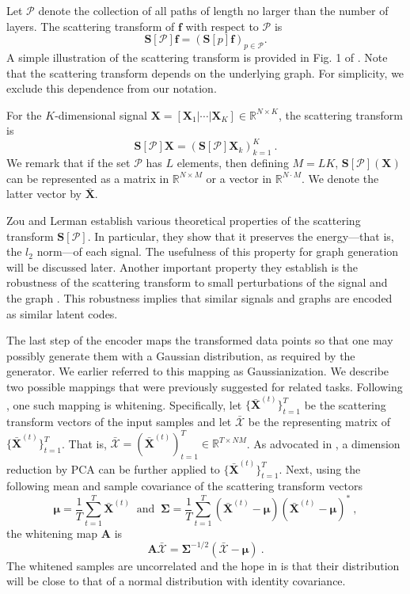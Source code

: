 \documentclass[conference]{IEEEtran}
\def\RR{\mathbb{R}}
\def\cP{\mathcal{P}}
\def\BA{\boldsymbol{A}}
\def\BS{\boldsymbol{S}}
\def\BX{\boldsymbol{X}}
\def\Bf{\boldsymbol{f}}
\def\Bmu{\boldsymbol{\mu}}
\def\BSigma{\boldsymbol{\Sigma}}
\begin{document}
Let $\cP$ denote the collection of all paths of length no larger than the number of layers. The scattering transform of $\Bf$ with respect to $\cP$ is
\begin{equation*}
    \BS[\cP] \Bf = ( \BS[p] \Bf )_{p \in \cP}.
\end{equation*}
A simple illustration of the scattering transform is provided in Fig. 1 of \cite{zou2018graph}. Note that the scattering transform depends on the underlying graph. For simplicity, we exclude this dependence from our notation.

For the $K$-dimensional signal $\BX = [\BX_1 | \cdots | \BX_K] \in \RR^{N \times K}$, the scattering transform is
\begin{equation*}
    \BS[\cP] \BX = (\BS[\cP] \BX_k)_{k=1}^K ~.
\end{equation*}
We remark that if the set ${\cP}$ has $L$ elements, then defining $M = L K$, $\BS[\cP](\BX)$ can be represented as a matrix in $\RR^{N \times M}$ or a vector in  $\RR^{N \cdot M}$. We denote the latter vector by $\bar{\BX}$.

Zou and Lerman \cite{zou2018graph} establish various theoretical properties of the scattering transform $\BS[\cP]$. In particular, they show that it preserves the energy---that is, the $l_2$ norm---of each signal. The usefulness of this property for graph generation will be discussed later. Another important property they establish is the robustness of the scattering transform to small perturbations of the signal and the graph \cite[\S 5]{zou2018graph}. This robustness implies that similar signals and graphs are encoded as similar latent codes. 

The last step of the encoder maps the transformed data points so that one may possibly generate them with a Gaussian distribution, as required by the generator. We earlier referred to this mapping as Gaussianization. We describe two possible mappings that were previously suggested for related tasks. Following \cite{angles2018generative}, one such mapping is whitening. Specifically, let
$\{\bar{\BX}^{(t)} \}_{t=1}^T$  be the scattering transform vectors of the input samples and let $\bar{\boldsymbol{\mathcal{X}}}$ be the representing matrix of $\{\bar{\BX}^{(t)} \}_{t=1}^T$. That is, $\bar{\boldsymbol{\mathcal{X}}} = (\bar{\BX}^{(t)})_{t=1}^{T} \in \RR^{T \times NM}$. As advocated in  \cite{angles2018generative}, a dimension reduction by PCA can be further applied to $\{\bar{\BX}^{(t)} \}_{t=1}^T$. Next, using the following mean and sample covariance of the scattering transform vectors
\begin{equation*}
    \Bmu = \frac{1}{T} \sum_{t=1}^T \bar{\BX}^{(t)}  \ \text{ and } \
    \BSigma = \frac{1}{T} \sum_{t=1}^T (\bar{\BX}^{(t)} - \Bmu) (\bar{\BX}^{(t)} - \Bmu)^* ~,
\end{equation*}
the whitening map $\BA$ is 
\begin{equation}\label{eq:A}
    \BA \bar{\boldsymbol{\mathcal{X}}} = \BSigma^{-1/2} (\bar{\boldsymbol{\mathcal{X}}} - \Bmu) ~.  
\end{equation}
The whitened samples are uncorrelated and the hope in \cite{angles2018generative} is that their distribution will be close to that of a normal distribution with identity covariance. 
\end{document}
